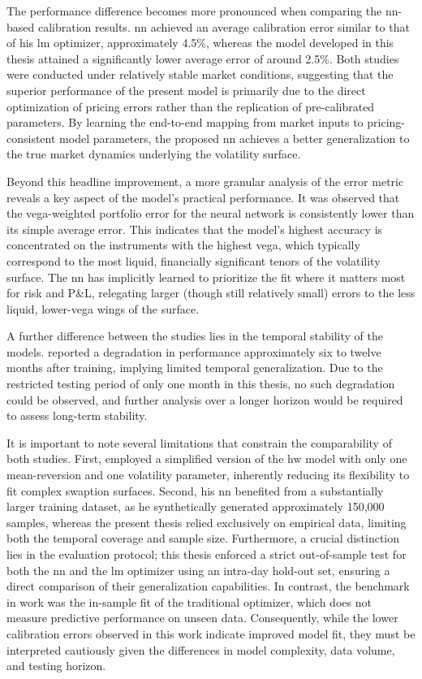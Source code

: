 The performance difference becomes more pronounced when comparing the \ac{nn}-based calibration results. \textcite{hernandez2016model} \ac{nn} achieved an average calibration error similar to that of his \ac{lm} optimizer, approximately 4.5\%, whereas the model developed in this thesis attained a significantly lower average error of around 2.5\%. Both studies were conducted under relatively stable market conditions, suggesting that the superior performance of the present model is primarily due to the direct optimization of pricing errors rather than the replication of pre-calibrated parameters. By learning the end-to-end mapping from market inputs to pricing-consistent model parameters, the proposed \ac{nn} achieves a better generalization to the true market dynamics underlying the volatility surface.

Beyond this headline improvement, a more granular analysis of the error metric reveals a key aspect of the model's practical performance. It was observed that the vega-weighted portfolio error for the neural network is consistently lower than its simple average error. This indicates that the model's highest accuracy is concentrated on the instruments with the highest vega, which typically correspond to the most liquid, financially significant tenors of the volatility surface. The \ac{nn} has implicitly learned to prioritize the fit where it matters most for risk and P\&L, relegating larger (though still relatively small) errors to the less liquid, lower-vega wings of the surface.

A further difference between the studies lies in the temporal stability of the models. \textcite{hernandez2016model} reported a degradation in performance approximately six to twelve months after training, implying limited temporal generalization. Due to the restricted testing period of only one month in this thesis, no such degradation could be observed, and further analysis over a longer horizon would be required to assess long-term stability.

It is important to note several limitations that constrain the comparability of both studies. First, \textcite{hernandez2016model} employed a simplified version of the \ac{hw} model with only one mean-reversion and one volatility parameter, inherently reducing its flexibility to fit complex swaption surfaces. Second, his \ac{nn} benefited from a substantially larger training dataset, as he synthetically generated approximately 150,000 samples, whereas the present thesis relied exclusively on empirical data, limiting both the temporal coverage and sample size. Furthermore, a crucial distinction lies in the evaluation protocol; this thesis enforced a strict out-of-sample test for both the \ac{nn} and the \ac{lm} optimizer using an intra-day hold-out set, ensuring a direct comparison of their generalization capabilities. In contrast, the benchmark in \textcite{hernandez2016model} work was the in-sample fit of the traditional optimizer, which does not measure predictive performance on unseen data. Consequently, while the lower calibration errors observed in this work indicate improved model fit, they must be interpreted cautiously given the differences in model complexity, data volume, and testing horizon.
